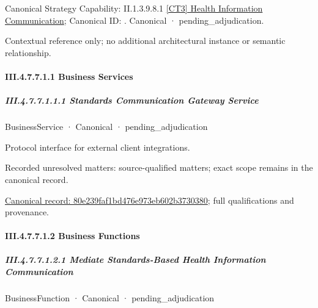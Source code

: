 {\small Canonical Strategy Capability: II.1.3.9.8.1 \hyperref[element:9794b2aff43443b495a19aefe0efa67b]{[CT3] Health Information Communication}; Canonical ID: \texttt{}. Canonical · pending\_adjudication.}\par
Contextual reference only; no additional architectural instance or semantic relationship.\par
\paragraph*{III.4.7.7.1.1 Business Services}
\label{navigation:III.4.7.7.1.1}

\subparagraph*{III.4.7.7.1.1.1 Standards Communication Gateway Service}
\label{navigation:III.4.7.7.1.1.1}

\label{element:80e239faf1bd476e973eb602b3730380}
{\small BusinessService · Canonical · pending\_adjudication}\par

Protocol interface for external client integrations.


{\small Recorded unresolved matters: source-qualified matters; exact scope remains in the canonical record.}\par
{\footnotesize \href{../../../../continuum/business/business-service/80e239faf1bd476e973eb602b3730380.md}{Canonical record: 80e239faf1bd476e973eb602b3730380}; full qualifications and provenance.}\par
\paragraph*{III.4.7.7.1.2 Business Functions}
\label{navigation:III.4.7.7.1.2}

\subparagraph*{III.4.7.7.1.2.1 Mediate Standards-Based Health Information Communication}
\label{navigation:III.4.7.7.1.2.1}

\label{element:6c14589215f744a2b76605a2023b04fb}
{\small BusinessFunction · Canonical · pending\_adjudication}\par

